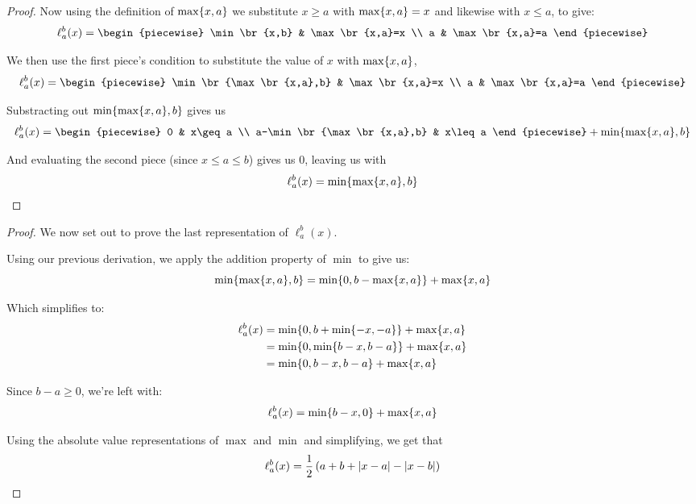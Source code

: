 \begin{theorem}
\begin{proof}
        Now using the definition of $\max\{x,a\}$ we substitute $x\geq a$ with $\max\{x,a\}=x$ and likewise with $x\leq a$, to give:
        $$
            \ell_{a}^{b}(x)=\begin{piecewise}
                \min\br{x,b} & \max\br{x,a}=x \\
                a & \max\br{x,a}=a
            \end{piecewise}
        $$

        We then use the first piece's condition to substitute the value of $x$ with $\max\{x,a\}$,
        $$
            \ell_{a}^{b}(x)=\begin{piecewise}
                \min\br{\max\br{x,a},b} & \max\br{x,a}=x \\
                a & \max\br{x,a}=a
            \end{piecewise}
        $$

        Substracting out $\min\{\max\{x,a\},b\}$ gives us
        $$
            \ell_{a}^{b}(x)=\begin{piecewise}
                0 & x\geq a \\
                a-\min\br{\max\br{x,a},b} & x\leq a
            \end{piecewise}+\min\br{\max\br{x,a},b}
        $$

        And evaluating the second piece (since $x\leq a\leq b$) gives us $0$, leaving us with
        $$
            \ell_{a}^{b}(x)=\min\{\max\{x,a\},b\}
        $$
    \end{proof}

    \begin{proof}
        We now set out to prove the last representation of $\ell_{a}^{b}(x)$.

        Using our previous derivation, we apply the addition property of $\min$ to give us:
        $$
            \min\{\max\{x,a\},b\}=\min\{0,b-\max\{x,a\}\}+\max\{x,a\}
        $$

        Which simplifies to:
        \begin{align*}
            \ell_{a}^{b}(x) &= \min\{0,b+\min\{-x,-a\}\}+\max\{x,a\} \\
                            &= \min\{0,\min\{b-x,b-a\}\}+\max\{x,a\} \\
                            &=\min\{0,b-x,b-a\}+\max\{x,a\}
        \end{align*}

        Since $b-a\geq 0$, we're left with:
        $$
            \ell_{a}^{b}(x)=\min\{b-x,0\}+\max\{x,a\}
        $$

        Using the absolute value representations of $\max$ and $\min$ and simplifying, we get that
        $$
            \ell_{a}^{b}(x)=\frac{1}{2}\left(a+b+\abs{x-a}-\abs{x-b}\right)
        $$
    \end{proof}
\end{theorem}

